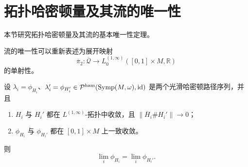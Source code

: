 \section{拓扑哈密顿量及其流的唯一性}
\label{sec:uniqueness-topological-hamiltonian-flow}

本节研究拓扑哈密顿量及其流的基本唯一性定理。

流的唯一性可以重新表述为展开映射
\[
 \overline\pi_2:\overline{\mathcal Q}
 \longrightarrow L_0^{(1,\infty)}([0,1]\times M,\mathbb R)
\]
的单射性。

\begin{theorem}\label{thm:uniqueness-topological-hamiltonian-flow}
设
$\lambda_i=\phi_{H_i}$、$\lambda_i'=\phi_{H_i'}\in
\mathcal P^{\mathrm{ham}}(\operatorname{Symp}(M,\omega),\operatorname{id})$
是两个光滑哈密顿路径序列，并且
\begin{enumerate}[label=(\arabic*)]
 \item $H_i$ 与 $H_i'$ 都在 $L^{(1,\infty)}$-拓扑中收敛，且
 $\|\overline H_i\#H_i'\|\to0$；
 \item $\phi_{H_i}$ 与 $\phi_{H_i'}$ 都在 $[0,1]\times M$ 上一致收敛。
\end{enumerate}
则
\[
 \lim_i\phi_{H_i}=\lim_i\phi_{H_i'}.
\]
\end{theorem}

